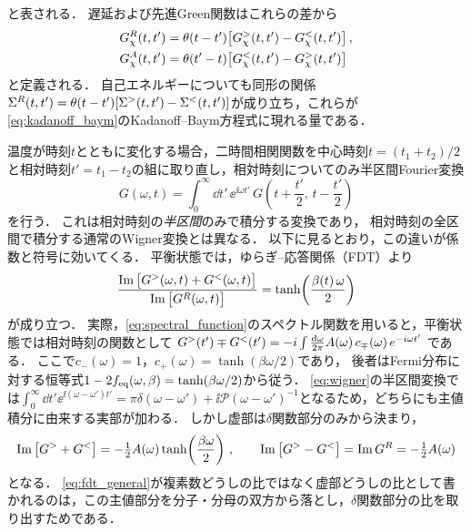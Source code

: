 \documentclass[a4paper,11pt,onecolumn,baselineskip=14.5pt]{jlreq}
\begin{document}
と表される．
遅延および先進Green関数はこれらの差から
\begin{equation}
  \begin{aligned}
    G^{R}_\chi(t,t') &= \theta(t-t')\big[G^{>}_\chi(t,t')-G^{<}_\chi(t,t')\big]\,, \\
    G^{A}_\chi(t,t') &= \theta(t'-t)\big[G^{<}_\chi(t,t')-G^{>}_\chi(t,t')\big]
  \end{aligned}
  \label{eq:retarded_advanced}
\end{equation}
と定義される．
自己エネルギーについても同形の関係$\Sigma^{R}(t,t')=\theta(t-t')[\Sigma^{>}(t,t')-\Sigma^{<}(t,t')]$が成り立ち\cite{Wang2024}，これらが\eqref{eq:kadanoff_baym}のKadanoff--Baym方程式に現れる量である．

温度が時刻$t$とともに変化する場合，二時間相関関数を中心時刻$t=(t_1+t_2)/2$と相対時刻$t'=t_1-t_2$の組に取り直し，相対時刻についてのみ半区間Fourier変換
\begin{equation}
  G(\omega,t) = \int_0^{\infty}\dd{t'}\,\ee^{\ii\omega t'}\,
  G\!\left(t+\frac{t'}{2},\,t-\frac{t'}{2}\right)
  \label{eq:wigner}
\end{equation}
を行う\cite{Wang2024}．
これは相対時刻の\emph{半区間}のみで積分する変換であり，
相対時刻の全区間で積分する通常のWigner変換とは異なる．
以下に見るとおり，この違いが係数と符号に効いてくる．
平衡状態では，ゆらぎ--応答関係（FDT）より
\begin{equation}
  \frac{\Im\big[G^{>}(\omega,t)+G^{<}(\omega,t)\big]}{\Im\big[G^{R}(\omega,t)\big]}
  = \tanh\!\left(\frac{\beta(t)\,\omega}{2}\right)
  \label{eq:fdt_general}
\end{equation}
が成り立つ．
実際，\eqref{eq:spectral_function}のスペクトル関数を用いると，平衡状態では相対時刻の関数として
$G^{>}(t')\mp G^{<}(t')=-i\int\frac{\dd{\omega}}{2\pi}A(\omega)\,c_{\mp}(\omega)\,e^{-i\omega t'}$
である．
ここで$c_-(\omega)=1$，$c_+(\omega)=\tanh(\beta\omega/2)$であり，
後者はFermi分布に対する恒等式$1-2f_{\mathrm{eq}}(\omega,\beta)=\tanh(\beta\omega/2)$から従う．
\eqref{eq:wigner}の半区間変換では$\int_0^{\infty}\dd{t'}\ee^{\ii(\omega-\omega')t'}=\pi\delta(\omega-\omega')+\ii\mathcal{P}(\omega-\omega')^{-1}$となるため，どちらにも主値積分に由来する実部が加わる．
しかし虚部は$\delta$関数部分のみから決まり，
\begin{equation}
  \Im\big[G^{>}+G^{<}\big] = -\tfrac{1}{2}A(\omega)\tanh\!\left(\frac{\beta\omega}{2}\right)\,,
  \qquad
  \Im\big[G^{>}-G^{<}\big] = \Im G^{R} = -\tfrac{1}{2}A(\omega)
  \label{eq:fdt_imparts}
\end{equation}
となる．
\eqref{eq:fdt_general}が複素数どうしの比ではなく虚部どうしの比として書かれるのは，この主値部分を分子・分母の双方から落とし，$\delta$関数部分の比を取り出すためである．
\end{document}
